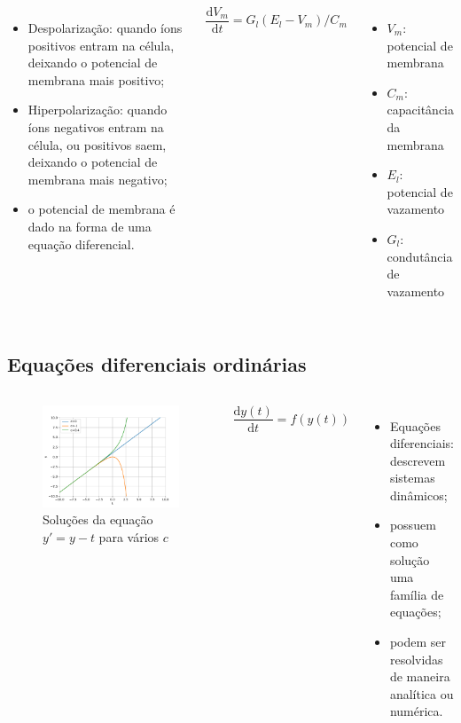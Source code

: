\begin{frame}
	\begin{columns}[t]
		\column{5cm}
			\begin{itemize}
				\item Despolarização: quando íons positivos entram na célula, deixando o potencial de membrana mais positivo;
				\item Hiperpolarização: quando íons negativos entram na célula, ou positivos saem, deixando o potencial de membrana mais negativo;
				\item o potencial de membrana é dado na forma de uma equação diferencial.
			\end{itemize}
		\column{5cm}
			\[
				\frac{\mathrm{d}V_m}{\mathrm{d}t}=G_l(E_l-V_m)/C_m
			\]
			\begin{itemize}
				\item $V_m$: potencial de membrana
				\item $C_m$: capacitância da membrana
				\item $E_l$: potencial de vazamento
				\item $G_l$: condutância de vazamento
			\end{itemize}
	\end{columns}
\end{frame}

\subsection*{Equações diferenciais ordinárias}
\begin{frame}
	\begin{columns}[t]
		\column{5cm}
			\begin{figure}
				\centering
				\caption{Soluções da equação $y'=y-t$ para vários $c$}
				\label{fig:solucao}
				\includegraphics[width=0.7\linewidth]{figs/solucao}
			\end{figure}
		\column{5cm}
			\[
				\frac{\mathrm{d}y(t)}{\mathrm{d}t}=f(y(t))
			\]
			\begin{itemize}
				\item Equações diferenciais: descrevem sistemas dinâmicos;
				\item possuem como solução uma família de equações;
				\item podem ser resolvidas de maneira analítica ou numérica.
			\end{itemize}
	\end{columns}
\end{frame}

